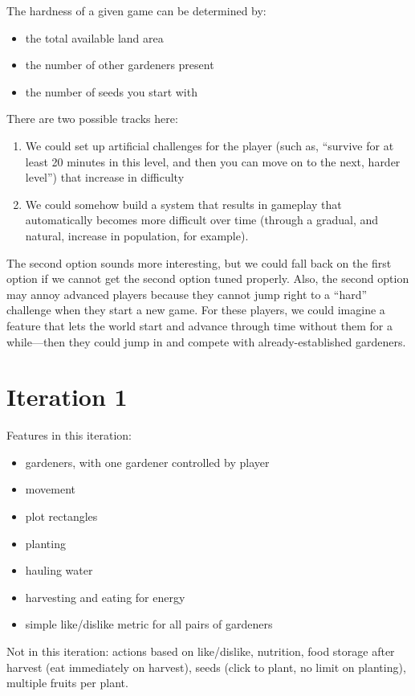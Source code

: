 \documentclass[12pt]{article}
\begin{document}
The hardness of a given game can be determined by:
\begin{itemize}
\item the total available land area
\item the number of other gardeners present
\item the number of seeds you start with
\end{itemize}

There are two possible tracks here:
\begin{enumerate}
\item We could set up artificial challenges for the player (such as, ``survive for at least 20 minutes in this level, and then you can move on to the next, harder level'') that increase in difficulty
\item We could somehow build a system that results in gameplay that automatically becomes more difficult over time (through a gradual, and natural, increase in population, for example).
\end{enumerate}
The second option sounds more interesting, but we could fall back on the first option if we cannot get the second option tuned properly.
Also, the second option may annoy advanced players because they cannot jump right to a ``hard'' challenge when they start a new game.
For these players, we could imagine a feature that lets the world start and advance through time without them for a while---then they could jump in and compete with already-established gardeners.      
   

\section{Iteration 1}

Features in this iteration:
\begin{itemize}
\item gardeners, with one gardener controlled by player
\item movement
\item plot rectangles
\item planting
\item hauling water
\item harvesting and eating for energy
\item simple like/dislike metric for all pairs of gardeners
\end{itemize}

Not in this iteration:  actions based on like/dislike, nutrition, food storage after harvest (eat immediately on harvest), seeds (click to plant, no limit on planting), multiple fruits per plant.
\end{document}
